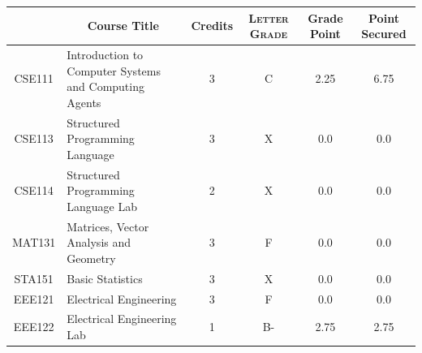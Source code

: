 \documentclass[11pt]{article}
\newcommand*{\numtwo}[1]{\pgfmathprintnumber[
                    fixed, precision=2, fixed zerofill=true]{#1}}
\begin{document}
                \begin{center}
                    \renewcommand{\arraystretch}{1.08}
                    
                \begin{tabular}{|c|l|c|>{\scshape}c|c|c|}
                \hline  \rule[-1ex]{0pt}{3.5ex} {\centering{\bf Course Code}} &  \multicolumn{1}{c|}{\textbf{Course Title}}  & {\bf Credits} & {\bf Letter Grade} & {\bf Grade Point} & {\bf Point Secured}  \\ 
                \hline   CSE111 &  Introduction to Computer Systems and Computing Agents		 & 3 & C & 2.25 & 6.75 \\ %
                \hline   CSE113 &  Structured Programming Language		 & 3 & X & 0.0 & 0.0 \\ %
                \hline   CSE114 &  Structured Programming Language Lab		 & 2 & X & 0.0 & 0.0 \\ %
                \hline   MAT131 &  Matrices, Vector Analysis and Geometry		 & 3 & F & 0.0 & 0.0 \\ %
                \hline   STA151 &  Basic Statistics		 & 3 & X & 0.0 & 0.0 \\ %
                \hline   EEE121 &  Electrical Engineering		 & 3 & F & 0.0 & 0.0 \\ %
                \hline   EEE122 &  Electrical Engineering Lab		 & 1 & B- & 2.75 & 2.75 \\ %

\hline                %
                \end{tabular}
                \end{center}
                \renewcommand{\arraystretch}{1.03}
\end{document}
